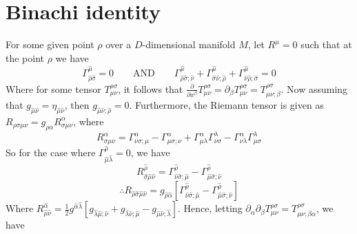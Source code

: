 \documentclass{article}
\begin{document}
	\section{Binachi identity}
		For some given point $\rho$ over a $D$-dimensional manifold $M$, let $R^\mu = 0$ such that at the point $\rho$ we have
		$$ \Gamma_{\hat{\rho}\hat\sigma}^{\hat\mu} = 0 \quad\quad \text{AND} \quad\quad \Gamma_{\hat\rho \hat\sigma; \hat\nu}^{\hat\mu} +\Gamma_{\hat\sigma \hat\nu; \hat\rho}^{\hat\mu} + \Gamma_{\hat\nu \hat\rho; \hat\sigma}^{\hat\mu} = 0$$
		Where for some tensor $T_{\mu\nu}^{\rho\sigma}$, it follows that $\frac{\partial}{\partial x^\beta} T_{\mu\nu}^{\rho\sigma}= \partial_\beta T_{\mu\nu}^{\rho\sigma} = T_{\mu\nu;\beta}^{\rho\sigma} $. 
		Now assuming that $g_{\hat\mu \hat\nu} = \eta_{\hat\mu \hat\nu}$, then $g_{\hat\mu \hat\nu ; \hat \rho} = 0$. Furthermore, the Riemann tensor is given as
		$ R_{\rho \sigma \mu \nu} = g_{\rho \alpha} R^{\alpha}_{\sigma \mu\nu}$, where
		$$ R^{\alpha}_{\sigma\mu\nu} = \Gamma_{\nu\sigma;\mu}^{\alpha} - \Gamma_{\mu\sigma;\nu}^\alpha + \Gamma_{\mu \lambda}^\alpha \Gamma_{\nu\sigma}^\lambda - \Gamma_{\nu\lambda}^{\alpha}\Gamma_{\mu\sigma}^{\lambda}$$
		So for the case where $\Gamma_{\hat\mu \hat\lambda}^{\hat\rho} = 0$, we have
		$$ R_{\hat \sigma \hat \mu \hat \nu}^{\hat\rho} = \Gamma_{\hat\nu \hat\sigma ; \hat \mu}^{\hat \rho} - \Gamma_{\hat \mu \hat \sigma; \hat \nu}^{\hat \rho}$$
		$$ \therefore R_{\hat \rho \hat \sigma \hat \mu \hat\nu} = g_{\hat \rho \hat \alpha} \left[\Gamma_{\hat\nu \hat\sigma ; \hat \mu}^{\hat \rho} - \Gamma_{\hat \mu \hat \sigma; \hat \nu}^{\hat \rho}\right]$$
		Where $R_{\hat\mu\hat\nu}^{\hat\alpha} = \frac12 g^{\hat\alpha \hat \lambda} \left[ g_{\hat \lambda \hat \mu; \hat\nu} + g_{\hat \lambda \hat \nu; \hat \mu} - g_{\hat\mu \hat \nu; \hat \lambda}\right]$.
		Hence, letting $\partial_\alpha \partial_\beta T_{\mu\nu}^{\rho \sigma} = T_{\mu\nu; \beta \alpha}^{\rho \sigma } $, we have
\end{document}
